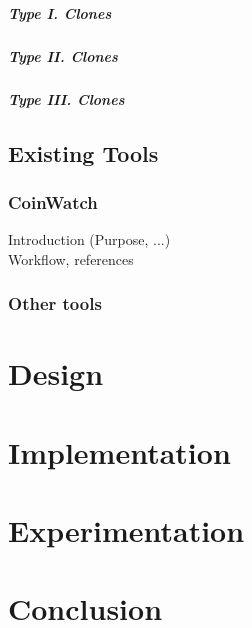       \paragraph{Type I. Clones}
      \paragraph{Type II. Clones}
      \paragraph{Type III. Clones}

  \section{Existing Tools}

    \subsection*{CoinWatch}
      Introduction (Purpose, ...) \\
      Workflow, references

    \subsection*{Other tools}


\chapter{Design}
\label{chapter:design}


\chapter{Implementation}
\label{chapter:implementation}


\chapter{Experimentation}
\label{chapter:experimentation}


\chapter{Conclusion}
\label{chapter:conclusion}
